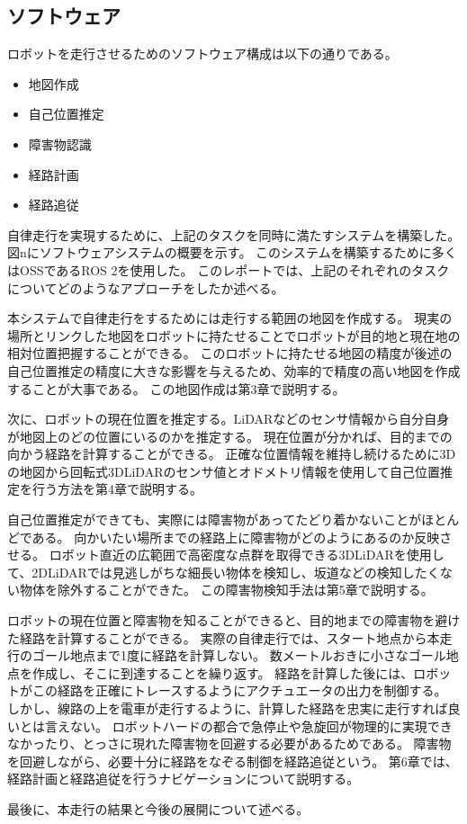 \subsection{ソフトウェア}
ロボットを走行させるためのソフトウェア構成は以下の通りである。
\begin{itemize}
    \item 地図作成
    \item 自己位置推定
    \item 障害物認識
    \item 経路計画
    \item 経路追従
\end{itemize}

自律走行を実現するために、上記のタスクを同時に満たすシステムを構築した。
図nにソフトウェアシステムの概要を示す。
このシステムを構築するために多くはOSSであるROS 2\cite{ROS2}を使用した。
このレポートでは、上記のそれぞれのタスクについてどのようなアプローチをしたか述べる。

本システムで自律走行をするためには走行する範囲の地図を作成する。
現実の場所とリンクした地図をロボットに持たせることでロボットが目的地と現在地の相対位置把握することができる。
このロボットに持たせる地図の精度が後述の自己位置推定の精度に大きな影響を与えるため、効率的で精度の高い地図を作成することが大事である。
この地図作成は第3章で説明する。

次に、ロボットの現在位置を推定する。LiDARなどのセンサ情報から自分自身が地図上のどの位置にいるのかを推定する。
現在位置が分かれば、目的までの向かう経路を計算することができる。
正確な位置情報を維持し続けるために3Dの地図から回転式3DLiDARのセンサ値とオドメトリ情報を使用して自己位置推定を行う方法を第4章で説明する。

自己位置推定ができても、実際には障害物があってたどり着かないことがほとんどである。
向かいたい場所までの経路上に障害物がどのようにあるのか反映させる。
ロボット直近の広範囲で高密度な点群を取得できる3DLiDARを使用して、2DLiDARでは見逃しがちな細長い物体を検知し、坂道などの検知したくない物体を除外することができた。
この障害物検知手法は第5章で説明する。

ロボットの現在位置と障害物を知ることができると、目的地までの障害物を避けた経路を計算することができる。
実際の自律走行では、スタート地点から本走行のゴール地点まで1度に経路を計算しない。
数メートルおきに小さなゴール地点を作成し、そこに到達することを繰り返す。
経路を計算した後には、ロボットがこの経路を正確にトレースするようにアクチュエータの出力を制御する。
しかし、線路の上を電車が走行するように、計算した経路を忠実に走行すれば良いとは言えない。
ロボットハードの都合で急停止や急旋回が物理的に実現できなかったり、とっさに現れた障害物を回避する必要があるためである。
障害物を回避しながら、必要十分に経路をなぞる制御を経路追従という。
第6章では、経路計画と経路追従を行うナビゲーションについて説明する。

最後に、本走行の結果と今後の展開について述べる。